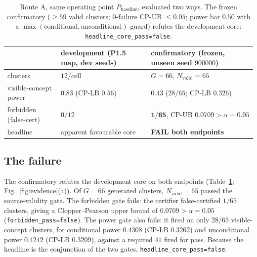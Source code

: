 \begin{table}[t]
\centering
\caption{Route A, same operating point $P_{\text{baseline}}$, evaluated two ways. The frozen confirmatory
($\geq 59$ valid clusters; $0$-failure CP-UB $\leq 0.05$; power bar $0.50$ with a
$\max(\text{conditional},\text{unconditional})$ guard) refutes the development core:
\texttt{headline\_core\_pass=false}.}
\label{tab:routeA}
\begin{tabular}{@{}lll@{}}
\toprule
 & development (P1.5 map, dev seeds) & confirmatory (frozen, unseen seed $900000$) \\
\midrule
clusters                 & $12$/cell                 & $G=66$, $N_{\text{valid}}=65$ \\
visible-concept power     & $0.83$ (CP-LB $0.56$)     & $\mathbf{0.43}$ ($28/65$; CP-LB $\mathbf{0.326}$) \\
forbidden (false-cert)    & $0/12$                    & $\mathbf{1/65}$, CP-UB $\mathbf{0.0709} > \alpha{=}0.05$ \\
headline                  & apparent favourable core  & \textbf{FAIL both endpoints} \\
\bottomrule
\end{tabular}
\end{table}


\subsection{The failure}
The confirmatory refutes the development core on both endpoints (Table~\ref{tab:routeA};
Fig.~\ref{fig:evidence}(a)). Of $G=66$ generated clusters, $N_{\text{valid}}=65$ passed the source-validity gate.
The forbidden gate fails: the certifier false-certified $1/65$ clusters, giving a Clopper--Pearson upper bound
of $0.0709 > \alpha = 0.05$ (\texttt{forbidden\_pass=false}). The power gate also fails: it fired on only
$28/65$ visible-concept clusters, for conditional power $0.4308$ (CP-LB $0.3262$) and unconditional power
$0.4242$ (CP-LB $0.3209$), against a required $41$ fired for pass. Because the headline is the conjunction of
the two gates, \texttt{headline\_core\_pass=false}. 

